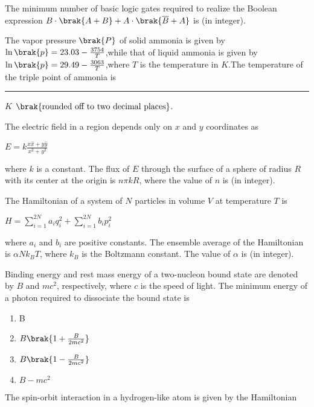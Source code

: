 \item The minimum number of basic logic gates required to realize the Boolean expression $B \cdot\brak{A+B}+A\cdot\brak{\overline{B}+A}$  is \underline{\hspace{2cm}} (in integer).\\
\item The vapor pressure $\brak{P}$ of solid ammonia is given by $\ln{\brak{p}}=23.03-\frac{3754}{T}$,while that of liquid ammonia is given by $\ln{\brak{p}}=29.49-\frac{3063}{T}$,where $T$ is the temperature in $K$.The temperature of the triple point of ammonia is \rule{2cm}{0.4pt} $K$ $\brak{\text{rounded off to two decimal places}}$. \\
\item The electric field in a region depends only on $x$ and $y$ coordinates as
\begin{center}
 $E = k\frac{x\hat{x}+y\hat{y}}{x^2 + y^2}$   
\end{center}
where $k$ is a constant. The flux of $E$ through the surface of a sphere of radius $R$ with its center at the origin is $n \pi k R$, where the value of $n$ is \underline{\hspace{1cm}} (in integer).\\
\item The Hamiltonian of a system of $N$ particles in volume $V$ at temperature $T$ is
\begin{center}
$H = \sum\limits_{i=1}^{2N} a_i q_i^2 + \sum\limits_{i=1}^{2N} b_i p_i^2$
\end{center}
where $a_i$ and $b_i$ are positive constants. The ensemble average of the Hamiltonian is $\alpha N k_B T$, where $k_B$ is the Boltzmann constant. The value of $\alpha$ is \underline{\hspace{1cm}} (in integer).
\newpage
\item Binding energy and rest mass energy of a two-nucleon bound state are denoted by $ B$  and  $mc^2$, respectively, where $c$ is the speed of light. The minimum energy of a photon required to dissociate the bound state is
\begin{enumerate}
\item B
\item $B\brak{ 1 + \frac{B}{2mc^2}}$
\item $B\brak{1 - \frac{B}{2mc^2}}$
\item $B-mc^2$
\end{enumerate}
\item The spin-orbit interaction in a hydrogen-like atom is given by the Hamiltonian
